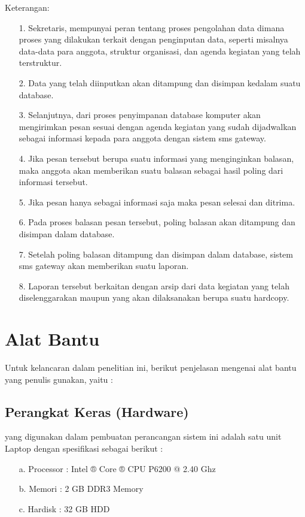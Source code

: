 \documentclass{jtetiproposalskripsi}
\begin{document}
Keterangan:
\begin{itemize}

\item[1.]	Sekretaris, mempunyai peran tentang proses pengolahan data dimana proses yang dilakukan terkait dengan penginputan data, seperti misalnya data-data para anggota, struktur organisasi, dan agenda kegiatan yang telah terstruktur.
\item[2.]	Data yang telah diinputkan akan ditampung dan disimpan  kedalam suatu database.
\item[3.]	Selanjutnya, dari proses penyimpanan database komputer akan mengirimkan pesan sesuai dengan agenda kegiatan yang sudah dijadwalkan sebagai informasi kepada para anggota dengan sistem sms gateway.
\item[4.]	Jika pesan tersebut berupa suatu  informasi yang menginginkan balasan, maka anggota akan memberikan suatu balasan sebagai hasil poling dari informasi tersebut.
\item[5.]	Jika pesan hanya sebagai informasi saja maka pesan selesai dan ditrima.
\item[6.]	Pada proses balasan pesan tersebut, poling balasan akan ditampung dan disimpan dalam database.
\item[7.]	Setelah poling balasan ditampung dan disimpan dalam database, sistem sms gateway akan memberikan suatu laporan.
\item[8.]	Laporan tersebut berkaitan dengan arsip dari data kegiatan yang telah diselenggarakan maupun yang akan dilaksanakan berupa suatu hardcopy.
\end{itemize}


\section{Alat Bantu}
Untuk kelancaran dalam penelitian ini, berikut penjelasan mengenai alat bantu yang penulis gunakan, yaitu :

\subsection{Perangkat Keras (Hardware) }

yang digunakan dalam pembuatan perancangan sistem ini adalah satu unit Laptop dengan spesifikasi sebagai berikut :
\begin{itemize}

\item[a.]	Processor	: Intel ® Core ® CPU
 P6200 @ 2.40 Ghz
\item[b.]	Memori	: 2 GB DDR3 Memory
\item[c.]	Hardisk	: 32 GB HDD
\end{itemize}
\end{document}
